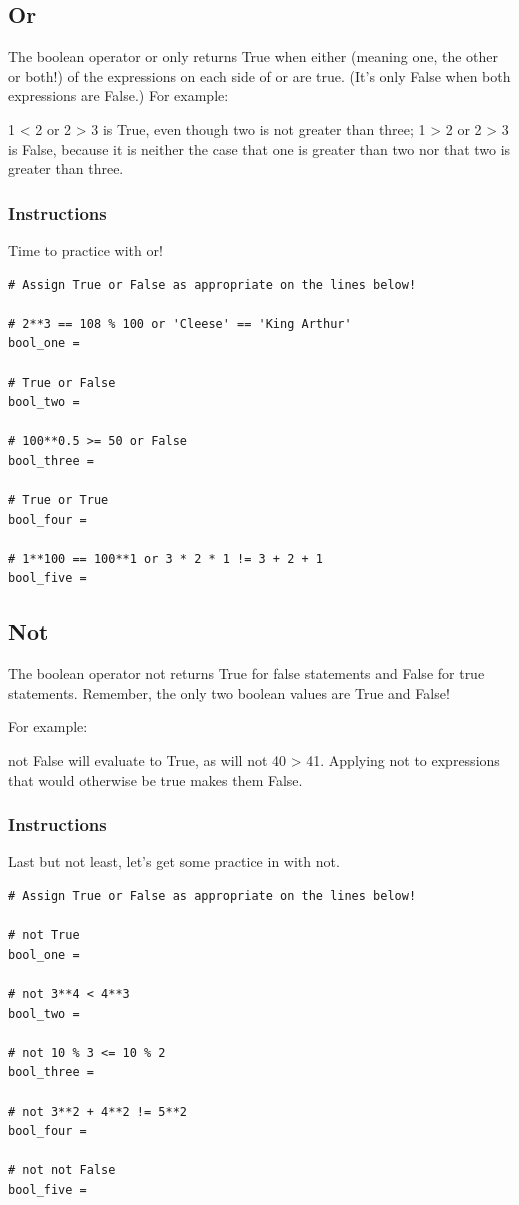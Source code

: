 \documentclass[12pt,a4paper,final,twoside,onecolumn,titlepage]{book}
\begin{document}
\subsection{Or}
The boolean operator or only returns True when either (meaning one, the other or both!) of the expressions on each side of or are true. (It's only False when both expressions are False.) For example:

    1 < 2 or 2 > 3 is True, even though two is not greater than three;
    1 > 2 or 2 > 3 is False, because it is neither the case that one is greater than two nor that two is greater than three.

\subsubsection{Instructions}

Time to practice with or!

\begin{lstlisting}
# Assign True or False as appropriate on the lines below!

# 2**3 == 108 % 100 or 'Cleese' == 'King Arthur'
bool_one = 

# True or False
bool_two = 

# 100**0.5 >= 50 or False
bool_three = 

# True or True
bool_four = 

# 1**100 == 100**1 or 3 * 2 * 1 != 3 + 2 + 1
bool_five = 
\end{lstlisting}

\subsection{Not}

The boolean operator not returns True for false statements and False for true statements. Remember, the only two boolean values are True and False!

For example:

not False will evaluate to True, as will not 40 > 41. Applying not to expressions that would otherwise be true makes them False.

\subsubsection{Instructions}

Last but not least, let's get some practice in with not.
\begin{lstlisting}
# Assign True or False as appropriate on the lines below!

# not True
bool_one = 

# not 3**4 < 4**3
bool_two = 

# not 10 % 3 <= 10 % 2
bool_three = 

# not 3**2 + 4**2 != 5**2
bool_four = 

# not not False
bool_five = 
\end{lstlisting}
\end{document}
